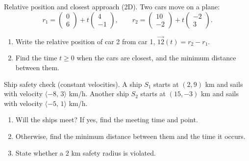\documentclass[11pt]{article}
\def\textbf#1{#1}%
\def\mathbf#1{#1}%
\newcounter{question}
\begin{document}
\begin{question}
\textbf{Relative position and closest approach (2D).}
Two cars move on a plane:
\[
\mathbf{r}_1=\begin{pmatrix}0\\6\end{pmatrix}+t\begin{pmatrix}4\\-1\end{pmatrix},\qquad
\mathbf{r}_2=\begin{pmatrix}10\\-2\end{pmatrix}+t\begin{pmatrix}-2\\3\end{pmatrix}.
\]
\begin{enumerate}
  \item Write the relative position of car 2 from car 1, \(\overrightarrow{1\!2}(t)=\mathbf{r}_2-\mathbf{r}_1\).
  \item Find the time \(t\ge0\) when the cars are closest, and the minimum distance between them.
\end{enumerate}
\end{question}

\begin{question}
\textbf{Ship safety check (constant velocities).}
A ship \(S_1\) starts at \((2,9)\) km and sails with velocity \(\langle -8,\,3\rangle\) km/h.
Another ship \(S_2\) starts at \((15,-3)\) km and sails with velocity \(\langle -5,\,1\rangle\) km/h.
\begin{enumerate}
  \item Will the ships meet? If yes, find the meeting time and point.
  \item Otherwise, find the minimum distance between them and the time it occurs.
  \item State whether a \(2\) km safety radius is violated.
\end{enumerate}
\end{question}
\end{document}
